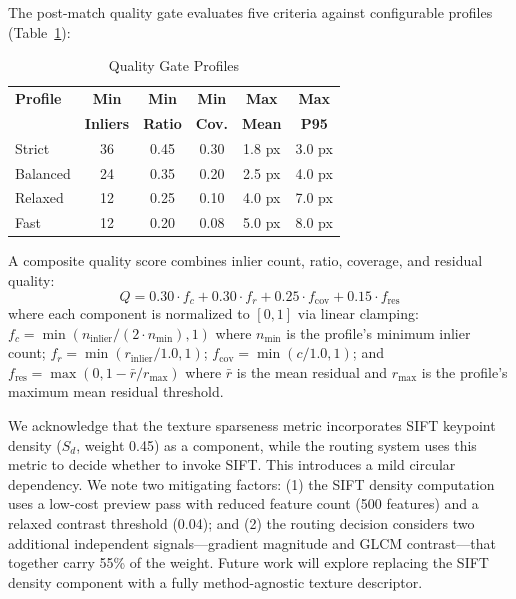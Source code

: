 \documentclass[lettersize,journal]{IEEEtran}
\begin{document}
The post-match quality gate evaluates five criteria against configurable profiles (Table~\ref{tab:quality_profiles}):

\begin{table}[htbp]
\caption{Quality Gate Profiles}
\label{tab:quality_profiles}
\centering
\small
\begin{tabular}{@{}lccccc@{}}
\toprule
\textbf{Profile} & \textbf{Min} & \textbf{Min} & \textbf{Min} & \textbf{Max} & \textbf{Max} \\
 & \textbf{Inliers} & \textbf{Ratio} & \textbf{Cov.} & \textbf{Mean} & \textbf{P95} \\
\midrule
Strict & 36 & 0.45 & 0.30 & 1.8 px & 3.0 px \\
Balanced & 24 & 0.35 & 0.20 & 2.5 px & 4.0 px \\
Relaxed & 12 & 0.25 & 0.10 & 4.0 px & 7.0 px \\
Fast & 12 & 0.20 & 0.08 & 5.0 px & 8.0 px \\
\bottomrule
\end{tabular}
\end{table}

A composite quality score combines inlier count, ratio, coverage, and residual quality:
\begin{equation}
Q = 0.30 \cdot f_c + 0.30 \cdot f_r + 0.25 \cdot f_{\text{cov}} + 0.15 \cdot f_{\text{res}}
\end{equation}
where each component is normalized to $[0, 1]$ via linear clamping: $f_c = \min(n_{\text{inlier}} / (2 \cdot n_{\min}), 1)$ where $n_{\min}$ is the profile's minimum inlier count; $f_r = \min(r_{\text{inlier}} / 1.0, 1)$; $f_{\text{cov}} = \min(c / 1.0, 1)$; and $f_{\text{res}} = \max(0, 1 - \bar{r} / r_{\max})$ where $\bar{r}$ is the mean residual and $r_{\max}$ is the profile's maximum mean residual threshold.

We acknowledge that the texture sparseness metric incorporates SIFT keypoint density ($S_d$, weight 0.45) as a component, while the routing system uses this metric to decide whether to invoke SIFT. This introduces a mild circular dependency. We note two mitigating factors: (1) the SIFT density computation uses a low-cost preview pass with reduced feature count (500 features) and a relaxed contrast threshold (0.04); and (2) the routing decision considers two additional independent signals—gradient magnitude and GLCM contrast—that together carry 55\% of the weight. Future work will explore replacing the SIFT density component with a fully method-agnostic texture descriptor.
\end{document}
